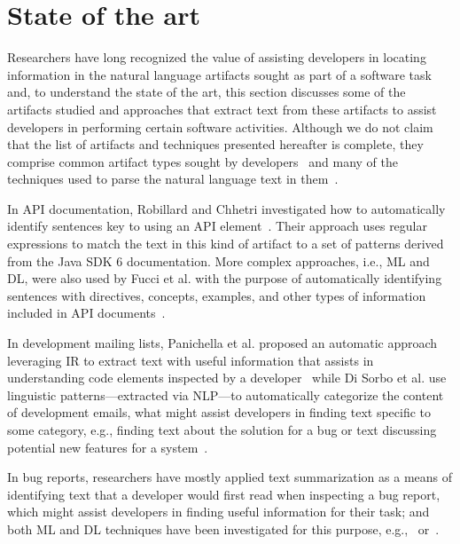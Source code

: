 \section{State of the art}
\label{cp1:novelty}


Researchers have long recognized the value of 
assisting developers in locating information in the natural language artifacts sought as part of a software task
and, to understand the state of the art, this section discusses 
some of the artifacts studied and approaches 
that extract text from these artifacts
to assist developers in performing certain 
software activities.
Although we do not claim that the list of artifacts and techniques presented hereafter is complete,
they comprise common artifact types sought by developers~\cite{umarji2008archetypal, Li2013}
and many of the techniques used to parse the natural language text in them~\cite{arnaoudova2015}.



In API documentation, Robillard and Chhetri investigated how to automatically identify 
sentences key to using an API element~\cite{Robillard2015}.
Their approach uses regular expressions to match the text in this kind of artifact 
to a set of patterns derived from the Java SDK 6 documentation.
More complex approaches, i.e.,  \acf{ML} and \acf{DL},
were also used by Fucci et al.
with the purpose of automatically identifying sentences with 
directives, concepts, examples, and other types of information included in API documents~\cite{fucci2019}.



In development mailing lists, Panichella et al. 
proposed an automatic approach leveraging \acf{IR} to extract 
text with useful information that assists in understanding code elements inspected by a developer~\cite{panichella2012}
while Di Sorbo et al. use linguistic patterns---extracted via \acf{NLP}---to
automatically categorize the content of development emails, what might 
assist developers in finding text specific to some category, e.g., 
finding text about the solution for a bug or text discussing potential 
new features for a system~\cite{Sorbo2015}.



In bug reports, researchers have mostly applied text summarization
as a means of identifying text that a developer would first read when inspecting a bug report, 
which might assist developers in finding useful information for their task;
and both \acs{ML} and 
\acs{DL} techniques have been investigated for this purpose, 
e.g.,~\cite{Lotufo2012} or~\cite{li2018deep}.




